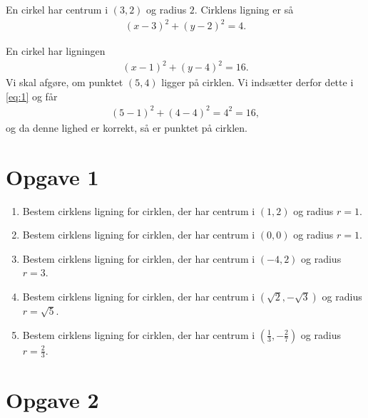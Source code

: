 \begin{exa}
	En cirkel har centrum i $(3,2)$ og radius $2$. Cirklens ligning er så
	\begin{align*}
		(x-3)^2 + (y-2)^2 = 4.
	\end{align*}
\end{exa}

\begin{exa}
	En cirkel har ligningen 
	\begin{align}\label{eq:1}
		(x-1)^2 + (y-4)^2 = 16. 
	\end{align}
	Vi skal afgøre, om punktet $(5,4)$ ligger på cirklen. Vi indsætter derfor dette
	i \eqref{eq:1} og får
	\begin{align*}
		(5-1)^2 + (4-4)^2 = 4^2=16,
	\end{align*}
	og da denne lighed er korrekt, så er punktet på cirklen. 
\end{exa}

\section*{Opgave 1}

\begin{enumerate}[label=\roman*)]
	\item Bestem cirklens ligning for cirklen, der har centrum i $(1,2)$
	 og radius $r = 1$.
	\item Bestem cirklens ligning for cirklen, der har centrum i $(0,0)$
	og radius $r = 1$.
	\item Bestem cirklens ligning for cirklen, der har centrum i $(-4,2)$
	og radius $r = 3$.
	\item Bestem cirklens ligning for cirklen, der har centrum i $(\sqrt{2},-\sqrt{3})$
	og radius $r = \sqrt{5}$.
	\item Bestem cirklens ligning for cirklen, der har centrum i $(\frac{1}{3},-\frac{2}{7})$
	og radius $r = \frac{2}{3}$.
\end{enumerate}

\section*{Opgave 2}

